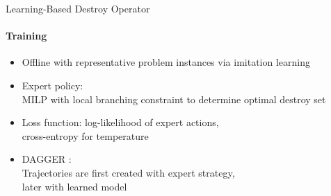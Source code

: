 \documentclass[aspectratio=1610]{beamer}
\newcommand{\important}[1]{{\color{green!60!black}#1}}
\begin{document}
\begin{frame}{Learning-Based Destroy Operator}
    \framesubtitle{Training}
	\begin{itemize}
		\itemsep 2ex
		\item Offline with representative problem instances via \important{imitation learning}
		\item \important{Expert policy:}\\
		MILP with local branching constraint to determine optimal destroy set
		\item \important{Loss function}: log-likelihood of expert actions,\\
		cross-entropy for temperature
		\item \important{DAGGER \citep{ross2011reduction}}:\\
		Trajectories are first created with expert strategy,\\
		later with learned model
	\end{itemize}
\end{frame}
\end{document}
